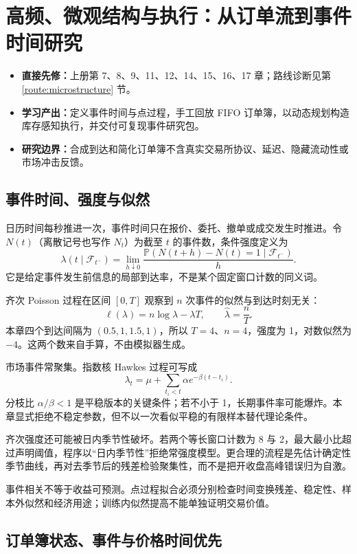 \chapter{高频、微观结构与执行：从订单流到事件时间研究}

\begin{itemize}
  \item \textbf{直接先修：}上册第 7、8、9、11、12、14、15、16、17 章；路线诊断见第 \ref{route:microstructure} 节。
  \item \textbf{学习产出：}定义事件时间与点过程，手工回放 FIFO 订单簿，以动态规划构造库存感知执行，并交付可复现事件研究包。
  \item \textbf{研究边界：}合成到达和简化订单簿不含真实交易所协议、延迟、隐藏流动性或市场冲击反馈。
\end{itemize}

\section{事件时间、强度与似然}

日历时间每秒推进一次，事件时间只在报价、委托、撤单或成交发生时推进。令 $N(t)$（离散记号也写作 $N_t$）为截至 $t$ 的事件数，条件强度定义为
\[
 \lambda(t\mid\mathcal F_{t^-})
 =\lim_{h\downarrow0}\frac{\mathbb P(N(t+h)-N(t)=1\mid\mathcal F_{t^-})}{h}.
\]
它是给定事件发生前信息的局部到达率，不是某个固定窗口计数的同义词。

齐次 Poisson 过程在区间 $[0,T]$ 观察到 $n$ 次事件的似然与到达时刻无关：
\[
 \ell(\lambda)=n\log\lambda-\lambda T,
 \qquad \widehat\lambda=\frac nT.
\]
本章四个到达间隔为 $(0.5,1,1.5,1)$，所以 $T=4$、$n=4$，强度为 1，对数似然为 $-4$。这两个数来自手算，不由模拟器生成。

市场事件常聚集。指数核 Hawkes 过程可写成
\[
 \lambda_t=\mu+\sum_{t_i<t}\alpha e^{-\beta(t-t_i)}.
\]
分枝比 $\alpha/\beta<1$ 是平稳版本的关键条件；若不小于 1，长期事件率可能爆炸。本章显式拒绝不稳定参数，但不以一次看似平稳的有限样本替代理论条件。

齐次强度还可能被日内季节性破坏。若两个等长窗口计数为 8 与 2，最大最小比超过声明阈值，程序以“日内季节性”拒绝常强度模型。更合理的流程是先估计确定性季节曲线，再对去季节后的残差检验聚集性，而不是把开收盘高峰错误归为自激。

\begin{diagnostic}
事件相关不等于收益可预测。点过程拟合必须分别检查时间变换残差、稳定性、样本外似然和经济用途；训练内似然提高不能单独证明交易价值。
\end{diagnostic}

\section{订单簿状态、事件与价格时间优先}

